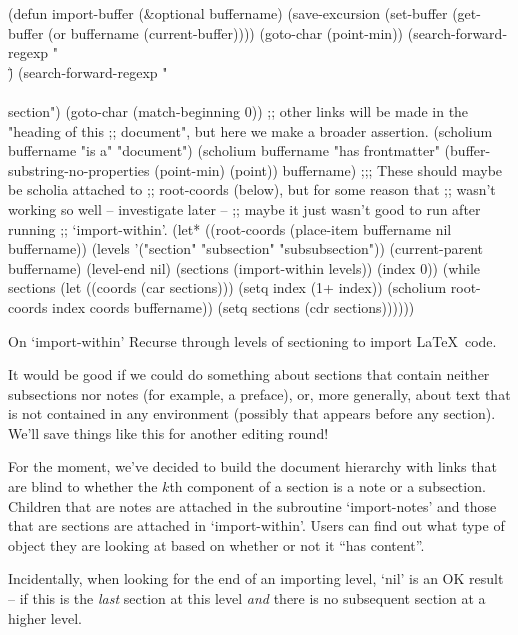 \begin{elisp}
(defun import-buffer (&optional buffername)
  (save-excursion
    (set-buffer (get-buffer (or buffername
                                (current-buffer))))
    (goto-char (point-min))
    (search-forward-regexp "\\\")
    (search-forward-regexp "\\\\section")
    (goto-char (match-beginning 0))
    ;; other links will be made in the "heading of this
    ;; document", but here we make a broader assertion.
    (scholium buffername "is a" "document")
    (scholium buffername
              "has frontmatter"
              (buffer-substring-no-properties
               (point-min)
               (point))
              buffername)
    ;;; These should maybe be scholia attached to
    ;; root-coords (below), but for some reason that
    ;; wasn't working so well -- investigate later --
    ;; maybe it just wasn't good to run after running
    ;; `import-within'.
    (let* ((root-coords (place-item buffername nil
                                    buffername))
           (levels
            '("section" "subsection" "subsubsection"))
           (current-parent buffername)
           (level-end nil)
           (sections (import-within levels))
           (index 0))
      (while sections
        (let ((coords (car sections)))
          (setq index (1+ index))
          (scholium root-coords
                    index
                    coords
                    buffername))
        (setq sections (cdr sections))))))
\end{elisp}

\begin{notate}{On `import-within'}
Recurse through levels of sectioning to import
\LaTeX\ code.

It would be good if we could do something about sections
that contain neither subsections nor notes (for example, a
preface), or, more generally, about text that is not
contained in any environment (possibly that appears before
any section).  We'll save things like this for another
editing round!

For the moment, we've decided to build the document
hierarchy with links that are blind to whether the $k$th
component of a section is a note or a subsection.
Children that are notes are attached in the subroutine
`import-notes' and those that are sections are attached in
`import-within'.  Users can find out what type of object
they are looking at based on whether or not it ``has
content''.

Incidentally, when looking for the end of an importing
level, `nil' is an OK result -- if this is the \emph{last}
section at this level \emph{and} there is no subsequent
section at a higher level.
\end{notate}


